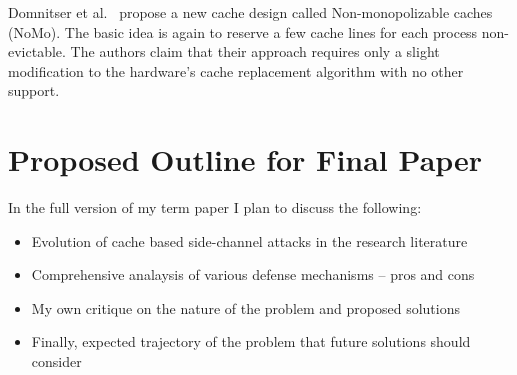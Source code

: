 \documentclass[onecolumn]{IEEEtran}
\begin{document}
Domnitser et al.~\cite{domnitser2012non} propose a new cache design
called Non-monopolizable caches (NoMo).  The basic idea is again to
reserve a few cache lines for each process non-evictable.  The authors
claim that their approach requires only a slight modification to the
hardware's cache replacement algorithm with no other support.

\section{Proposed Outline for Final Paper}

In the full version of my term paper I plan to discuss the following:

\begin{itemize}
\item Evolution of cache based side-channel attacks in the research
literature
\item Comprehensive analaysis of various defense mechanisms -- pros
and cons
\item My own critique on the nature of the problem and proposed
solutions
\item Finally, expected trajectory of the problem that future
solutions should consider
\end{itemize}



\end{document}
